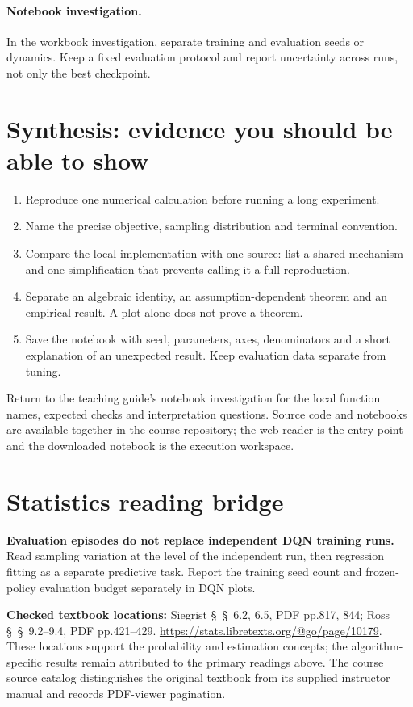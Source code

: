 \documentclass[11pt]{scrartcl}
\begin{document}
\paragraph{Notebook investigation.} In the workbook investigation, separate training and evaluation seeds or dynamics. Keep a fixed evaluation protocol and report uncertainty across runs, not only the best checkpoint.

\section*{Synthesis: evidence you should be able to show}
\begin{enumerate}
\item Reproduce one numerical calculation before running a long experiment.
\item Name the precise objective, sampling distribution and terminal convention.
\item Compare the local implementation with one source: list a shared mechanism
and one simplification that prevents calling it a full reproduction.
\item Separate an algebraic identity, an assumption-dependent theorem and an
empirical result. A plot alone does not prove a theorem.
\item Save the notebook with seed, parameters, axes, denominators and a short
explanation of an unexpected result. Keep evaluation data separate from tuning.
\end{enumerate}
Return to the teaching guide's notebook investigation for the local function
names, expected checks and interpretation questions. Source code and notebooks
are available together in the course repository; the web reader is the entry
point and the downloaded notebook is the execution workspace.
\section*{Statistics reading bridge}
\textbf{Evaluation episodes do not replace independent DQN training runs.} Read sampling variation at the level of the independent run, then regression fitting as a separate predictive task. Report the training seed count and frozen-policy evaluation budget separately in DQN plots.

\textbf{Checked textbook locations:} Siegrist \S~\S~6.2, 6.5, PDF pp.817, 844; Ross \S~\S~9.2--9.4, PDF pp.421--429. \url{https://stats.libretexts.org/@go/page/10179}. These locations support the probability and estimation concepts; the algorithm-specific results remain attributed to the primary readings above. The course source catalog distinguishes the original textbook from its supplied instructor manual and records PDF-viewer pagination.
\end{document}
